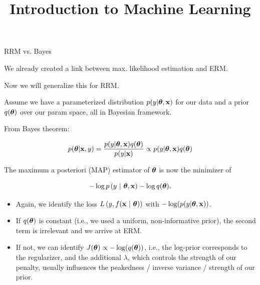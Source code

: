 \documentclass[11pt,compress,t,notes=noshow, xcolor=table]{beamer}
\title{Introduction to Machine Learning}
\begin{document}




\begin{vbframe} {RRM vs. Bayes}

We already created a link between max. likelihood estimation and ERM.

\lz 

Now we will generalize this for RRM.

\lz

Assume we have a parameterized distribution $p(y | \bm{\theta}, \mathbf{x})$ for our data and 
a prior $q(\bm{\theta})$ over our param space, all in Bayesian framework.

\lz \lz

From Bayes theorem:

$$
p(\bm{\theta} | \mathbf{x}, y) = \frac{p(y | \bm{\theta}, \mathbf{x}) q(\bm{\theta}) }{p(y | \mathbf{x})} \propto 
p(y | \bm{\theta}, \mathbf{x}) q(\bm{\theta})
$$

\framebreak

The maximum a posteriori (MAP) estimator of $\bm{\theta}$ is now the minimizer of

$$
- \log p\left(y ~|~ \bm{\theta}, \mathbf{x}\right) - \log q(\bm{\theta}).
$$

\begin{itemize}
  \item Again, we identify the loss $L\left(y, f(\mathbf{x} ~|~ \bm{\theta})\right)$ with $-\log(p(y | \bm{\theta}, \mathbf{x}))$.
  \item If $q(\bm{\theta})$ is constant (i.e., we used a uniform, non-informative 
  prior), the second term is irrelevant and we arrive at ERM.
  \item If not, we can identify $J(\bm{\theta}) \propto -\log(q(\bm{\theta}))$, i.e., 
  the log-prior corresponds to the regularizer, and the additional $\lambda$, which controls the strength of our
  penalty, usually influences the peakedness / inverse variance / strength of our prior.
\end{itemize}


\end{vbframe}
\end{document}
